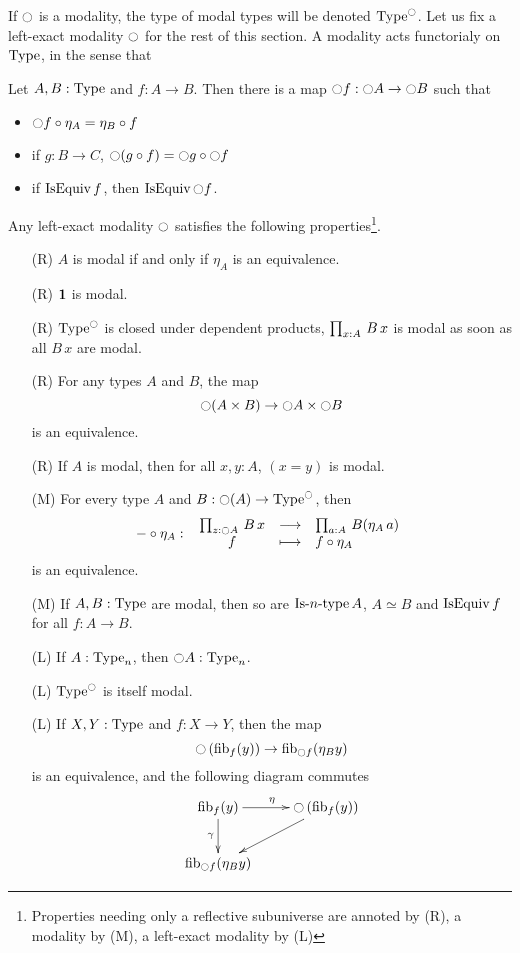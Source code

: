 If $\ocircle$ is a modality, the type of modal types will be denoted
$\operatorname{Type}^{\ocircle}$. Let us fix a left-exact modality $\ocircle$ for the rest
of this section. A modality acts functorialy on $\operatorname{Type}$, in the sense
that

\begin{lem}
  Let $A,B:\operatorname{Type}$ and $f:A\to B$. Then there is a map $\ocircle f:\ocircle
  A \to \ocircle B$ such that 
  \begin{itemize}
  \item $\ocircle f \circ \eta_A = \eta_B \circ f$
  \item if $g:B\to C$, $\ocircle (g \circ f) = \ocircle g \circ \ocircle f$
  \item if $\operatorname{IsEquiv} f$, then $\operatorname{IsEquiv} \ocircle f$.
  \end{itemize}
\end{lem}

\begin{prop}\label{prop:mod_prop}
  Any left-exact modality $\ocircle$ satisfies the following
  properties\footnote{Properties needing only a reflective subuniverse
    are annoted by (R), a modality by (M), a left-exact modality by (L)}.
  \begin{itemize}
  \item[\labelitemi(R)] $A$ is modal if and only if $\eta_A$ is an equivalence.
  \item[\labelitemi(R)] $\mathbf{1}$ is modal.
  \item[\labelitemi(R)] $\operatorname{Type}^{\ocircle}$ is closed under dependent
    products, \ie{} $\prod_{x:A}\, B\, x$ is modal as soon as all $B\,
    x$ are modal.
  \item[\labelitemi(R)] For any types $A$ and $B$, the map
    \[ \ocircle(A\times B) \to \ocircle A \times\ocircle B \]
    is an equivalence.
  \item[\labelitemi(R)] If $A$ is modal, then for all $x,y:A$, $(x=y)$
    is modal.
  \item[\labelitemi(M)] For every type $A$ and $B:\ocircle(A)\to\operatorname{Type}^{\ocircle}$, then
    \[ -\circ\eta_A \, \colon \left. \begin{array}{ccl} \prod_{z:\ocircle A}\, B\, x & \longrightarrow & \prod_{a:A}\, B(\eta_A\, a) \\ f & \longmapsto & f\circ \eta_A \end{array} \right. \]
    is an equivalence.
  \item[\labelitemi(M)] If $A,B:\operatorname{Type}$ are modal, then so are $\mathop{\mathrm{Is{\hbox{-}}}n\mathrm{{\hbox{-}} type}} A$, $A\simeq B$ and $\operatorname{IsEquiv} f$ for all $f:A\to B$.
  \item[\labelitemi(L)] If $A:\operatorname{Type}_n$, then $\ocircle A:\operatorname{Type}_n$.
  \item[\labelitemi(L)] $\operatorname{Type}^{\ocircle}$ is itself modal.
  \item[\labelitemi(L)] If $X,Y:\operatorname{Type}$ and $f:X\to Y$, then the map
    \[ \ocircle \left( \mathrm{fib}_{f}(y)\right) \to \mathrm{fib}_{\ocircle f}(\eta_B
        y) \]
    is an equivalence, and the following diagram commutes
\[ \xymatrix{
  \fib f y \ar[r]^\eta \ar[d]_\gamma & \modal \left(\fib f y \right) \ar[dl]\\
  \fib{\modal f}{\eta_B y} & }\] 
  \end{itemize}
\end{prop}

